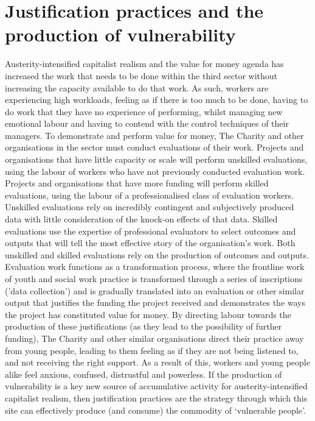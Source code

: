 \section{Justification practices and the production of vulnerability}
\label{sec:6-5-justification-practices}
Austerity-intensified capitalist realism and the value for money agenda has increased the work that needs to be done within the third sector without increasing the capacity available to do that work. As such, workers are experiencing high workloads, feeling as if there is too much to be done, having to do work that they have no experience of performing, whilst managing new emotional labour and having to contend with the control techniques of their managers. To demonstrate and perform value for money, The Charity and other organisations in the sector must conduct evaluations of their work. Projects and organisations that have little capacity or scale will perform unskilled evaluations, using the labour of workers who have not previously conducted evaluation work. Projects and organisations that have more funding will perform skilled evaluations, using the labour of a professionalised class of evaluation workers. Unskilled evaluations rely on incredibly contingent and subjectively produced data with little consideration of the knock-on effects of that data. Skilled evaluations use the expertise of professional evaluators to select outcomes and outputs that will tell the most effective story of the organisation's work. Both unskilled and skilled evaluations rely on the production of outcomes and outputs. Evaluation work functions as a transformation process, where the frontline work of youth and social work practice is transformed through a series of inscriptions ('data collection') and is gradually translated into an evaluation or other similar output that justifies the funding the project received and demonstrates the ways the project has constituted value for money. By directing labour towards the production of these justifications (as they lead to the possibility of further funding), The Charity and other similar organisations direct their practice away from young people, leading to them feeling as if they are not being listened to, and not receiving the right support. As a result of this, workers and young people alike feel anxious, confused, distrustful and powerless. If the production of vulnerability is a key new source of accumulative activity for austerity-intensified capitalist realism, then justification practices are the strategy through which this site can effectively produce (and consume) the commodity of `vulnerable people'. 

